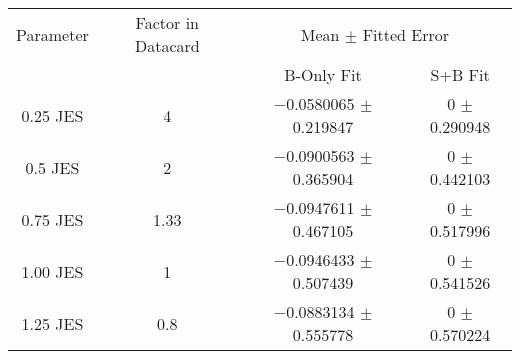 \begin{scriptsize}
\begin{table}
\centering
\begin{tabular}{cccc}
\toprule
Parameter & Factor in Datacard & \multicolumn{2}{c}{{Mean $\pm$ Fitted Error}}\\
 & & {B-Only Fit} & {S+B Fit}\\
\midrule
\num[round-precision=2]{0.25} JES & 4 & \num{-0.0580065} $\pm$ \num{0.219847} & \num{0} $\pm$ \num{0.290948}\\
\num[round-precision=2]{0.5} JES & 2 & \num{-0.0900563} $\pm$ \num{0.365904} & \num{0} $\pm$ \num{0.442103}\\
\num[round-precision=2]{0.75} JES & \num[round-precision=2]{1.33} & \num{-0.0947611} $\pm$ \num{0.467105} & \num{0} $\pm$ \num{0.517996}\\
\num[round-precision=2]{1.00} JES & 1 & \num{-0.0946433} $\pm$ \num{0.507439} & \num{0} $\pm$ \num{0.541526}\\
\num[round-precision=2]{1.25} JES & \num[round-precision=2]{0.8} & \num{-0.0883134} $\pm$ \num{0.555778} & \num{0} $\pm$ \num{0.570224}\\
\bottomrule
\end{tabular}
\end{table}
\end{scriptsize}
